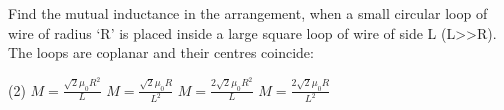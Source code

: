 \item Find the mutual inductance in the arrangement, when a small circular loop of wire of radius ‘R’ is placed inside a large square loop of wire of side L (L>>R). The loops are coplanar and their centres coincide:
    \begin{center}
    \end{center}
    \begin{tasks}(2)
        \task $\displaystyle M = \frac{\sqrt{2} \mu_0 R^2}{L}$
        \task $\displaystyle M = \frac{\sqrt{2} \mu_0 R}{L^2}$
        \task $\displaystyle M = \frac{2 \sqrt{2} \mu_0 R^2}{L}$
        \task $\displaystyle M = \frac{2 \sqrt{2} \mu_0 R}{L^2}$
    \end{tasks}